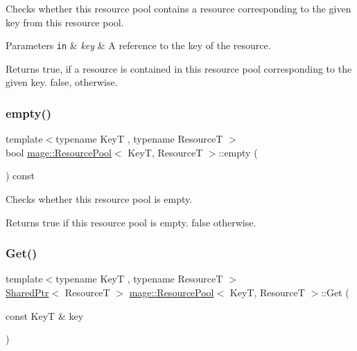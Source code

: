 Checks whether this resource pool contains a resource corresponding to the given key from this resource pool.


\begin{DoxyParams}[1]{Parameters}
\mbox{\tt in}  & {\em key} & A reference to the key of the resource. \\
\hline
\end{DoxyParams}
\begin{DoxyReturn}{Returns}
{\ttfamily true}, if a resource is contained in this resource pool corresponding to the given key. {\ttfamily false}, otherwise. 
\end{DoxyReturn}
\mbox{\label{classmage_1_1_resource_pool_aa406e4382ec7047c5576d039d7adc424}} 
\subsubsection{\texorpdfstring{empty()}{empty()}}
{\footnotesize\ttfamily template$<$typename KeyT , typename ResourceT $>$ \\
bool \mbox{\hyperlink{classmage_1_1_resource_pool}{mage\+::\+Resource\+Pool}}$<$ KeyT, ResourceT $>$\+::empty (\begin{DoxyParamCaption}{ }\end{DoxyParamCaption}) const\hspace{0.3cm}{\ttfamily [noexcept]}}

Checks whether this resource pool is empty.

\begin{DoxyReturn}{Returns}
{\ttfamily true} if this resource pool is empty. {\ttfamily false} otherwise. 
\end{DoxyReturn}
\mbox{\label{classmage_1_1_resource_pool_abdd0bc69948404b0185ef7c417e95ff9}} 
\subsubsection{\texorpdfstring{Get()}{Get()}}
{\footnotesize\ttfamily template$<$typename KeyT , typename ResourceT $>$ \\
\mbox{\hyperlink{namespacemage_a1e01ae66713838a7a67d30e44c67703e}{Shared\+Ptr}}$<$ ResourceT $>$ \mbox{\hyperlink{classmage_1_1_resource_pool}{mage\+::\+Resource\+Pool}}$<$ KeyT, ResourceT $>$\+::Get (\begin{DoxyParamCaption}\item[{const KeyT \&}]{key }\end{DoxyParamCaption})\hspace{0.3cm}{\ttfamily [noexcept]}}

